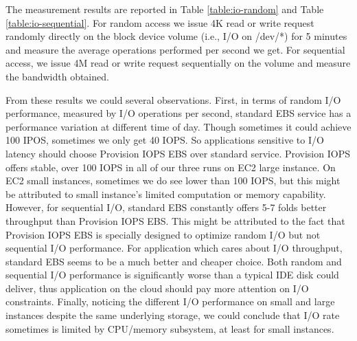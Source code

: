 \begin{table*}
\caption{Sequential I/O performance of Amazon EBS}
\label{table:io-sequential}
\end{table*}

The measurement results are reported in Table \ref{table:io-random} and Table \ref{table:io-sequential}. For random access we issue 4K read or write request randomly directly on the block device volume (i.e., I/O on /dev/*) for 5 minutes and measure the average operations performed per second we get. For sequential access, we issue 4M read or write request sequentially on the volume and measure the bandwidth obtained.

From these results we could several observations. First, in terms of random I/O performance, measured by I/O operations per second, standard EBS service has a performance variation at different time of day. Though sometimes it could achieve 100 IPOS, sometimes we only get 40 IOPS. So applications sensitive to I/O latency should choose Provision IOPS EBS over standard service. Provision IOPS offers stable, over 100 IOPS in all of our three runs on EC2 large instance. On EC2 small instances, sometimes we do see lower than 100 IOPS, but this might be attributed to small instance's limited computation or memory capability. However, for sequential I/O, standard EBS constantly offers 5-7 folds better throughput than Provision IOPS EBS. This might be attributed to the fact that Provision IOPS EBS is specially designed to optimize random I/O but not sequential I/O performance. For application which cares about I/O throughput, standard EBS seems to be a much better and cheaper choice. Both random and sequential I/O performance is significantly worse than a typical IDE disk could deliver, thus application on the cloud should pay more attention on I/O constraints. Finally, noticing the different I/O performance on small and large instances despite the same underlying storage, we could conclude that I/O rate sometimes is limited by CPU/memory subsystem, at least for small instances.


